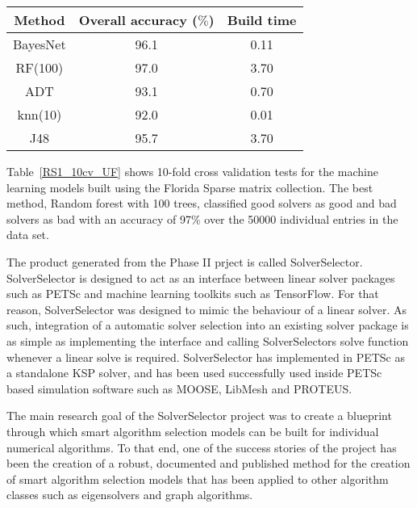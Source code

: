 \begin{table*}[h]
\centering
\caption{Convergence model accuracy and build time for 10-fold cross validation with SuiteSparse data set.}
\label{RS1_10cv_UF}
\begin{tabular}{|c|c|c|}    \hline  

Method                & Overall accuracy ($\%$)  & Build time \\ \hline\hline
BayesNet              &	96.1                    & 0.11	\\ \hline	    
RF(100)   &           97.0                    & 3.70	\\ \hline      
ADT                              &  93.1	                & 0.70	\\ \hline  
knn(10)                             &	92.0                    & 0.01	\\ \hline	    
J48                           &	95.7                    & 3.70	\\ \hline 	    
\end{tabular}
\end{table*}


Table~\ref{RS1_10cv_UF} shows 10-fold cross validation tests for the machine learning models built using the Florida Sparse matrix collection. The best method, Random forest with 100 trees, classified good solvers as good and bad solvers as bad with an accuracy of 97\% over the 50000 individual entries in the data set. 

The product generated from the Phase II prject is called SolverSelector. SolverSelector is designed to act as an interface between linear solver packages such as PETSc and machine learning toolkits such as TensorFlow. For that reason, SolverSelector was designed to mimic the behaviour of a linear solver. As such, integration of a automatic solver selection into an existing solver package is as simple as implementing the interface and calling SolverSelectors solve function whenever a linear solve is required. SolverSelector has implemented in PETSc as a standalone KSP solver, and has been used successfully used inside PETSc based simulation software such as MOOSE, LibMesh and PROTEUS.

The main research goal of the SolverSelector project was to create a blueprint through which smart algorithm selection models can be built for individual numerical algorithms. To that end, one of the success stories of the project has been the creation of a robust, documented and published method for the creation of smart algorithm selection models that has been applied to other algorithm classes such as eigensolvers and graph algorithms.   

